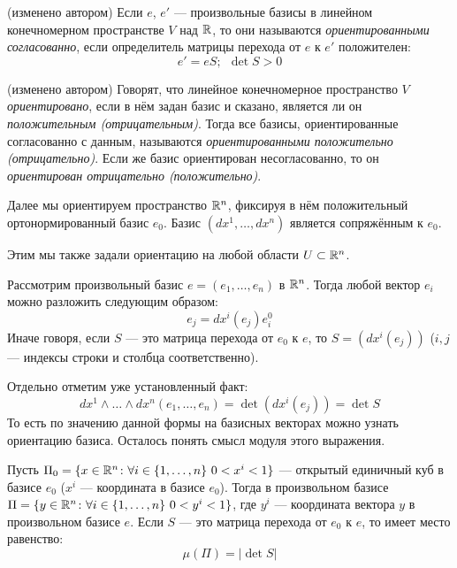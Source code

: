 \begin{definition} (изменено автором)
	Если $e$, $e'$ --- произвольные базисы в линейном конечномерном пространстве $V$ над $\mathbb{R}$, то они называются \textit{ориентированными согласованно}, если определитель матрицы перехода от $e$ к $e'$ положителен:
	\[
		e' = eS;\ \ \det S > 0
	\]
\end{definition}

\begin{definition} (изменено автором)
	Говорят, что линейное конечномерное пространство $V$ \textit{ориентировано}, если в нём задан базис и сказано, является ли он \textit{положительным (отрицательным)}. Тогда все базисы, ориентированные согласованно с данным, называются \textit{ориентированными положительно (отрицательно)}. Если же базис ориентирован несогласованно, то он \textit{ориентирован отрицательно (положительно)}.
\end{definition}

\begin{note}
	Далее мы ориентируем пространство $\mathbb{R}^n$, фиксируя в нём положительный ортонормированный базис $e_0$. Базис $(dx^1, \ldots, dx^n)$ является сопряжённым к $e_0$.
\end{note}

\begin{anote}
	Этим мы также задали ориентацию на любой области $U \subset \mathbb{R}^n$.
\end{anote}

\begin{note}
	Рассмотрим произвольный базис $e = (e_1, \ldots, e_n)$ в $\mathbb{R}^n$. Тогда любой вектор $e_i$ можно разложить следующим образом:
	\[
		e_j = dx^i(e_j)e_i^0
	\]
	Иначе говоря, если $S$ --- это матрица перехода от $e_0$ к $e$, то $S = (dx^i(e_j))$ ($i, j$ --- индексы строки и столбца соответственно).
	
	Отдельно отметим уже установленный факт:
	\[
		dx^1 \wedge \ldots \wedge dx^n (e_1, \ldots, e_n) = \det(dx^i(e_j)) = \det S
	\]
	То есть по значению данной формы на базисных векторах можно узнать ориентацию базиса. Осталось понять смысл модуля этого выражения.
\end{note}

\begin{proposition}
	Пусть $\Pi_0 = \{x \in \mathbb{R}^n \colon \forall i \in \{1, \ldots, n\}\ 0 < x^i < 1\}$ --- открытый единичный куб в базисе $e_0$ ($x^i$ --- координата в базисе $e_0$). Тогда в произвольном базисе $\Pi = \{y \in \mathbb{R}^n \colon \forall i \in \{1, \ldots, n\}\ 0 < y^i < 1\}$, где $y^i$ --- координата вектора $y$ в произвольном базисе $e$. Если $S$ --- это матрица перехода от $e_0$ к $e$, то имеет место равенство:
	\[
		\mu(\Pi) = |\det S|
	\]
\end{proposition}

